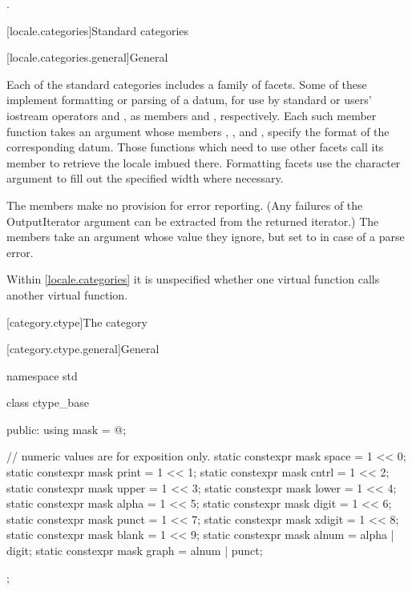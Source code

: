 \begin{itemdescr}
\pnum
\returns
{}.
\end{itemdescr}

[locale.categories]{Standard  categories}

[locale.categories.general]{General}

\pnum
Each of the standard categories includes a family of facets.
Some of these implement formatting or parsing of a datum,
for use by standard or users' iostream operators \tcode{<<} and \tcode{>>},
as members  and , respectively.
Each such member function takes an
%
 argument whose members
%
,
%
,
and
%
,
specify the format of the corresponding datum.
Those functions which need to use other facets call its member 
to retrieve the locale imbued there.
Formatting facets use the character argument 
to fill out the specified width where necessary.

\pnum
The  members make no provision for error reporting.
(Any failures of the OutputIterator argument can be extracted from
the returned iterator.)
The  members take an  argument
whose value they ignore,
but set to  in case of a parse error.

\pnum
Within \ref{locale.categories} it is unspecified whether
one virtual function calls another virtual function.

[category.ctype]{The  category}

[category.ctype.general]{General}

%
\begin{codeblock}
namespace std {
  class ctype_base {
  public:
    using mask = @\seebelow@;

    // numeric values are for exposition only.
    static constexpr mask space  = 1 << 0;
    static constexpr mask print  = 1 << 1;
    static constexpr mask cntrl  = 1 << 2;
    static constexpr mask upper  = 1 << 3;
    static constexpr mask lower  = 1 << 4;
    static constexpr mask alpha  = 1 << 5;
    static constexpr mask digit  = 1 << 6;
    static constexpr mask punct  = 1 << 7;
    static constexpr mask xdigit = 1 << 8;
    static constexpr mask blank  = 1 << 9;
    static constexpr mask alnum  = alpha | digit;
    static constexpr mask graph  = alnum | punct;
  };
}
\end{codeblock}

